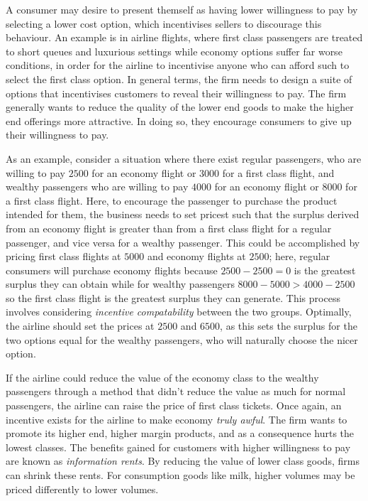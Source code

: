 \documentclass[12pt]{report}
\begin{document}
\begin{flushleft}
\bigskip
A consumer may desire to present themself as having lower willingness to pay
by selecting a lower cost option, which incentivises sellers to discourage this
behaviour. An example is in airline flights, where first class passengers are
treated to short queues and luxurious settings while economy options suffer far
worse conditions, in order for the airline to incentivise anyone who can afford
such to select the first class option. In general terms, the firm needs to 
design a suite of options that incentivises customers to reveal their 
willingness to pay. The firm generally wants to reduce the quality of the lower
end goods to make the higher end offerings more attractive. In doing so, they
encourage consumers to give up their willingness to pay.

\bigskip
As an example, consider a situation where there exist regular passengers, who
are willing to pay \(2500\) for an economy flight or \(3000\) for a first class
flight, and wealthy passengers who are willing to pay \(4000\) for an economy
flight or \(8000\) for a first class flight. Here, to encourage the passenger
to purchase the product intended for them, the business needs to set pricest
such that the surplus derived from an economy flight is greater than from a 
first class flight for a regular passenger, and vice versa for a wealthy 
passenger. This could be accomplished by pricing first class flights at 
\(5000\) and economy flights at \(2500\); here, regular consumers will
purchase economy flights because \(2500 - 2500 = 0\) is the greatest surplus
they can obtain while for wealthy passengers \(8000 - 5000 > 4000 - 2500\) so
the first class flight is the greatest surplus they can generate. This process
involves considering \textit{incentive compatability} between the two groups.
Optimally, the airline should set the prices at \(2500\) and \(6500\), as this
sets the surplus for the two options equal for the wealthy passengers, who will
naturally choose the nicer option.

\bigskip
If the airline could reduce the value of the economy class to the wealthy 
passengers through a method that didn't reduce the value as much for normal
passengers, the airline can raise the price of first class tickets. Once again,
an incentive exists for the airline to make economy \textit{truly awful}. The
firm wants to promote its higher end, higher margin products, and as a 
consequence hurts the lowest classes. The benefits gained for customers with
higher willingness to pay are known as \textit{information rents}. By reducing
the value of lower class goods, firms can shrink these rents. For 
consumption goods like milk, higher volumes may be priced differently to
lower volumes. 


\end{flushleft}
\end{document}
